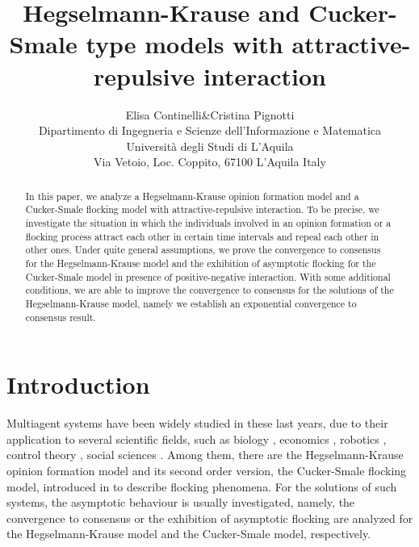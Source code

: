 \documentclass[a4paper,11pt,oneside]{article}
\begin{document}
	\theoremstyle{plain} \newtheorem{thm}{Theorem}[section] \newtheorem{cor}[thm]{Corollary} \newtheorem{lem}[thm]{Lemma} \newtheorem{prop}[thm]{Proposition} \theoremstyle{definition} \newtheorem{defn}{Definition}[section] 
	
	\newtheorem{oss}[thm]{Remark}
	\newtheorem{ex}{Example}[section]
	\newtheorem{lemma}{Lemma}[section]
	\title{Hegselmann-Krause and Cucker-Smale type models with attractive-repulsive interaction}
	\author{Elisa Continelli\hspace{0.2cm}\&\hspace{0.2cm}Cristina Pignotti \\Dipartimento di Ingegneria e Scienze dell'Informazione e Matematica\\
		Universit\`{a} degli Studi di L'Aquila\\
		Via Vetoio, Loc. Coppito, 67100 L'Aquila Italy}
	
	
	
	
	\maketitle
	
	
	\begin{abstract}
		In this paper, we analyze a Hegselmann-Krause opinion formation model and a Cucker-Smale flocking model with attractive-repulsive interaction. To be precise, we investigate the situation in which the individuals involved in an opinion formation or a flocking process attract each other in certain time intervals and repeal each other in other ones. Under quite general assumptions, we prove the convergence to consensus for the Hegselmann-Krause model and the exhibition of asymptotic flocking for the Cucker-Smale model in presence of positive-negative interaction. With some additional conditions, we are able to improve the convergence to consensus for the solutions of the Hegselmann-Krause model, namely we establish an exponential convergence to consensus result. 
	\end{abstract}
\section{Introduction}
	Multiagent systems have been widely studied in these last years, due to their application to several scientific fields, such as biology \cite{Cama, CS1}, economics \cite{Marsan, Jack}, robotics \cite{Bullo, Jad}, control theory \cite{Aydogdu, Borzi, WCB, PRT, Piccoli, Almeida2}, social sciences \cite{Bellomo, Campi, CF, Ajmone, Lac}. Among them, there are the Hegselmann-Krause opinion formation model \cite{HK} and its second order version, the Cucker-Smale flocking model, introduced in \cite{CS1} to describe flocking phenomena. For the solutions of such systems, the asymptotic behaviour is usually investigated, namely, the convergence to consensus or the exhibition of asymptotic flocking are analyzed for the Hegselmann-Krause model and the Cucker-Smale model, respectively. 
	
\end{document}
